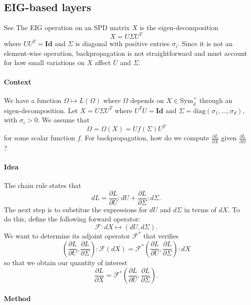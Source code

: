 \documentclass[10pt,a4paper]{book}
\theoremstyle{definition}
\theoremstyle{plain}
\theoremstyle{remark}
\newcommand{\Id}{\mathrm{\textbf{Id}}}
\begin{document}
\subsection{EIG-based layers}
See \cite{ionescu2015matrix}
The EIG operation on an SPD matrix $X$ is the eigen-decomposition 
\begin{equation}\label{eq.eig}
    X=U\Sigma U^T
\end{equation}
where $UU^T=\Id$ and $\Sigma$ is diagonal with positive entries $\sigma_i$. Since it is not an element-wise operation, backpropagation is not straightforward and must account for how small variations on $X$ affect $U$ and $\Sigma$. 


\paragraph{Context}

We have a function $\Omega \mapsto L(\Omega)$ where $\Omega$ depends on $X\in \text{Sym}_d^{+}$ through an eigen-decomposition.  
Let $X=U\Sigma U^{T}$ where $U^TU=\Id$ and $\Sigma=\text{diag}(\sigma_1,\dots, \sigma_d)$, with $\sigma_i>0$. 
We assume that
$$\Omega=\Omega(X)=Uf(\Sigma)U^T$$ for some scalar function $f$. 
For backpropagation, how do we compute $\frac{\partial L}{\partial X}$  given $\frac{\partial L}{\partial \Omega}$?

\paragraph{Idea}
The chain rule states that
$$dL=\frac{\partial L}{\partial U}: dU+\frac{\partial L}{\partial \Sigma}:d\Sigma.$$
The next step is to substitue the expressions for $dU$ and $d\Sigma$ in terms of $dX$. To do this, define the following forward operator:
$$\mathcal{F}: dX\mapsto (dU,d\Sigma).$$
We want to determine its adjoint operator $\mathcal{F}^{\ast}$ that verifies
$$\left(\frac{\partial L}{\partial U},\frac{\partial L}{\partial \Sigma}\right): \mathcal{F}(dX)=\mathcal{F}^{\ast}\left(\frac{\partial L}{\partial U},\frac{\partial L}{\partial \Sigma}\right):dX$$ so that we obtain our quantity of interest
$$\frac{\partial L}{\partial X}=\mathcal{F}^{\ast}\left(\frac{\partial L}{\partial U},\frac{\partial L}{\partial \Sigma}\right).$$

\paragraph{Method}
\end{document}

